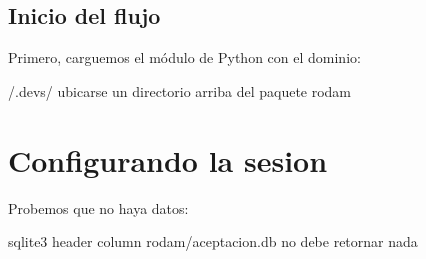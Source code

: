 \documentclass[letterpaper,10pt,spanish]{sphinxmanual}
\begin{document}


\subsection{Inicio del flujo}
\label{\detokenize{requerimientos/laboratorio_aceptacion:inicio-del-flujo}}
Primero, carguemos el módulo de Python con el dominio:

\begin{sphinxVerbatim}[commandchars=\\\{\}]
 \PYGZti{}/.devs/  \PYGZsh{} ubicarse un directorio arriba del paquete rodam
   
   
\end{sphinxVerbatim}

\begin{sphinxVerbatim}[commandchars=\\\{\}]
\end{sphinxVerbatim}


\section{Configurando la sesion}
\label{\detokenize{requerimientos/laboratorio_aceptacion:configurando-la-sesion}}
\begin{sphinxVerbatim}[commandchars=\\\{\}]
\end{sphinxVerbatim}

Probemos que no haya datos:

\begin{sphinxVerbatim}[commandchars=\\\{\}]
sqlite3 \PYGZhy{}header \PYGZhy{}column rodam/aceptacion.db  \PYGZsh{} no debe retornar nada
\end{sphinxVerbatim}

\begin{sphinxVerbatim}[commandchars=\\\{\}]
  
\end{sphinxVerbatim}
\end{document}
